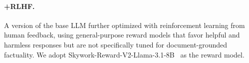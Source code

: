 \documentclass[10pt, a4paper, logo]{googledeepmind} %
\begin{document}
\paragraph{+RLHF.}
A version of the base LLM further optimized with reinforcement learning from human feedback, using general-purpose reward models that favor helpful and harmless responses but are not specifically tuned for document-grounded factuality. We adopt Skywork-Reward-V2-Llama-3.1-8B~\citep{liu2025skyworkrewardv2scalingpreferencedata} as the reward model.


\end{document}
